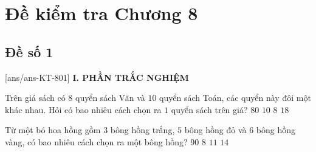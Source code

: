 \section*{Đề kiểm tra Chương 8}
\subsection*{Đề số 1}
\setcounter{ex}{0}\setcounter{bt}{0}
[ans/ans-KT-801]
\noindent\textbf{I. PHẦN TRẮC NGHIỆM}
\begin{ex}%
	Trên giá sách có $ 8 $ quyển sách Văn và $ 10 $ quyển sách Toán, các quyển này đôi một khác nhau. Hỏi có bao nhiêu cách chọn ra $ 1 $ quyển sách trên giá?
	\choice
	{$ 80 $}
	{$ 10 $}
	{$ 8 $}
	{\True $ 18 $}
\end{ex}
\begin{ex}%
	Từ một bó hoa hồng gồm $3$ bông hồng trắng, $5$ bông hồng đỏ và $6$ bông hồng vàng, có bao nhiêu cách chọn ra một bông hồng?
	\choice
	{$90$}
	{$8$}
	{$11$}
	{\True $14$}
\end{ex}

